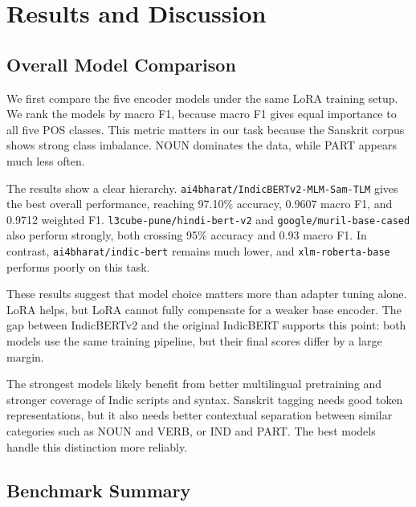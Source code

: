 \documentclass[conference]{IEEEtran}
\begin{document}
\section{Results and Discussion}

\subsection{Overall Model Comparison}
We first compare the five encoder models under the same LoRA training setup. We rank the models by macro F1, because macro F1 gives equal importance to all five POS classes. This metric matters in our task because the Sanskrit corpus shows strong class imbalance. NOUN dominates the data, while PART appears much less often.

The results show a clear hierarchy. \texttt{ai4bharat/IndicBERTv2-MLM-Sam-TLM} gives the best overall performance, reaching 97.10\% accuracy, 0.9607 macro F1, and 0.9712 weighted F1. \texttt{l3cube-pune/hindi-bert-v2} and \texttt{google/muril-base-cased} also perform strongly, both crossing 95\% accuracy and 0.93 macro F1. In contrast, \texttt{ai4bharat/indic-bert} remains much lower, and \texttt{xlm-roberta-base} performs poorly on this task.

These results suggest that model choice matters more than adapter tuning alone. LoRA helps, but LoRA cannot fully compensate for a weaker base encoder. The gap between IndicBERTv2 and the original IndicBERT supports this point: both models use the same training pipeline, but their final scores differ by a large margin.

The strongest models likely benefit from better multilingual pretraining and stronger coverage of Indic scripts and syntax. Sanskrit tagging needs good token representations, but it also needs better contextual separation between similar categories such as NOUN and VERB, or IND and PART. The best models handle this distinction more reliably.

\subsection{Benchmark Summary}
\end{document}
